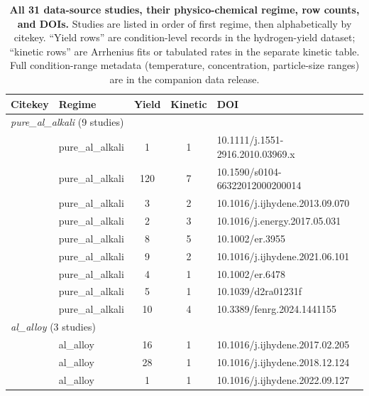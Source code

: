 \begin{table}[htbp]
\centering
\footnotesize
\caption{\textbf{All 31 data-source studies, their physico-chemical regime, row counts,
and DOIs.} Studies are listed in order of first regime, then alphabetically by citekey.
``Yield rows'' are condition-level records in the hydrogen-yield dataset; ``kinetic rows''
are Arrhenius fits or tabulated rates in the separate kinetic table.
Full condition-range metadata (temperature, concentration, particle-size ranges) are in
the companion data release.}
\label{tab:si_sources}
\begin{tabular}{llccp{5.5cm}}
\toprule
Citekey & Regime & Yield & Kinetic & DOI \\
\midrule
\multicolumn{5}{l}{\textit{pure\_al\_alkali} (9 studies)} \\
\citeauthor{deng2010}~\cite{deng2010}          & pure\_al\_alkali & 1 & 1 & 10.1111/j.1551-2916.2010.03969.x \\
\citeauthor{porciuncula2012}~\cite{porciuncula2012} & pure\_al\_alkali & 120 & 7 & 10.1590/s0104-66322012000200014 \\
\citeauthor{yavor2013}~\cite{yavor2013}        & pure\_al\_alkali & 3 & 2 & 10.1016/j.ijhydene.2013.09.070 \\
\citeauthor{wanghq2017}~\cite{wanghq2017}      & pure\_al\_alkali & 2 & 3 & 10.1016/j.energy.2017.05.031 \\
\citeauthor{wen2018}~\cite{wen2018}            & pure\_al\_alkali & 8 & 5 & 10.1002/er.3955 \\
\citeauthor{rin2021}~\cite{rin2021}            & pure\_al\_alkali & 9 & 2 & 10.1016/j.ijhydene.2021.06.101 \\
\citeauthor{prabu2021}~\cite{prabu2021}        & pure\_al\_alkali & 4 & 1 & 10.1002/er.6478 \\
\citeauthor{trowell2022}~\cite{trowell2022}    & pure\_al\_alkali & 5 & 1 & 10.1039/d2ra01231f \\
\citeauthor{zhang2024}~\cite{zhang2024}        & pure\_al\_alkali & 10 & 4 & 10.3389/fenrg.2024.1441155 \\
\midrule
\multicolumn{5}{l}{\textit{al\_alloy} (3 studies)} \\
\citeauthor{liuyh2017}~\cite{liuyh2017}        & al\_alloy & 16 & 1 & 10.1016/j.ijhydene.2017.02.205 \\
\citeauthor{qiao2019}~\cite{qiao2019}          & al\_alloy & 28 & 1 & 10.1016/j.ijhydene.2018.12.124 \\
\citeauthor{meng2022}~\cite{meng2022}          & al\_alloy & 1 & 1 & 10.1016/j.ijhydene.2022.09.127 \\

\end{tabular}
\end{table}
